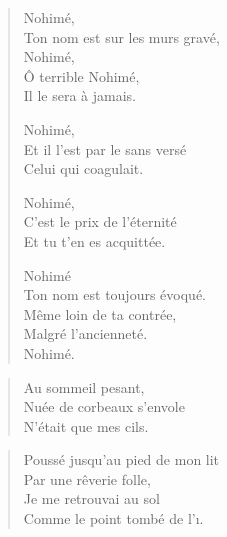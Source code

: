 \begin{verse}\quintil\tercet
  Nohimé,\\  %
  Ton nom est sur les murs gravé,\\  %
  Nohimé,\\  %
  Ô terrible Nohimé,\\  %
  Il le sera à jamais.

  Nohimé,\\  %
  Et il l’est par le sans versé\\  %
  Celui qui coagulait.

  Nohimé,\\  %
  C’est le prix de l’éternité\\  %
  Et tu t’en es acquittée.

  Nohimé\\  %
  Ton nom est toujours évoqué.\\  %
  Même loin de ta contrée,\\   %
  Malgré l’ancienneté.\\  %
  Nohimé. 
\end{verse}

\begin{verse}\haiku
  Au sommeil pesant,\\  %
  Nuée de corbeaux s’envole\\  %
  N’était que mes cils.
\end{verse}

\begin{verse}\quatrain
  Poussé jusqu’au pied de mon lit\\  %
  Par une rêverie folle,\\   %
  Je me retrouvai au sol\\  %
  Comme le point tombé de l’ı. 
\end{verse}

